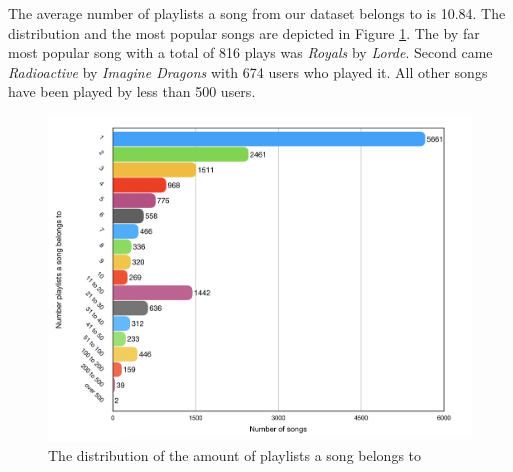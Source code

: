 The average number of playlists a song from our dataset belongs to is 10.84. The distribution and the most popular songs are depicted in Figure \ref{fig:popular_song_distribution}. The by far most popular song with a total of 816 plays was \textit{Royals} by \textit{Lorde}. Second came \textit{Radioactive} by \textit{Imagine Dragons} with 674 users who played it. All other songs have been played by less than 500 users.

\begin{figure}[ht]
    \centering
	\includegraphics[width=0.8\linewidth]{./img/times_played_numbers2.png}
	\caption{The distribution of the amount of playlists a song belongs to}
	\label{fig:popular_song_distribution}
\end{figure}
